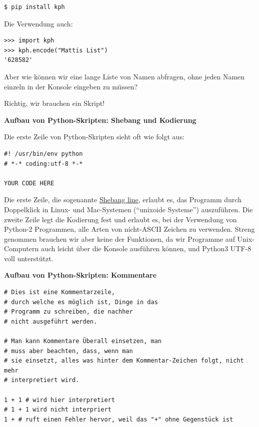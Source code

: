 \begin{verbatim}
$ pip install kph
\end{verbatim}

{Die Verwendung auch:}

\begin{verbatim}
>>> import kph
>>> kph.encode("Mattis List")
'628582'
\end{verbatim}

{Aber wie können wir eine lange Liste von Namen abfragen, ohne jeden
Namen einzeln in der Konsole eingeben zu müssen?}

{Richtig, wir brauchen ein Skript!}


\vspace{0.5cm}\par\noindent\textbf{Aufbau von Python-Skripten: Shebang und Kodierung}\vspace{0.5cm}

Die erste Zeile von Python-Skripten sieht oft wie folgt aus:

\begin{verbatim}
#! /usr/bin/env python
# *-* coding:utf-8 *-*

YOUR CODE HERE
\end{verbatim}

Die erste Zeile, die sogenannte
\href{http://de.wikipedia.org/wiki/Shebang}{Shebang line}, erlaubt es,
das Programm durch Doppelklick in Linux- und Mac-Systemen (``unixoide
Systeme'') auszuführen. Die zweite Zeile legt die Kodierung fest und
erlaubt es, bei der Verwendung von Python-2 Programmen, alle Arten von
nicht-ASCII Zeichen zu verwenden. Streng genommen brauchen wir aber
keine der Funktionen, da wir Programme auf Unix-Computern auch leicht
über die Konsole ausführen können, und Python3 UTF-8 voll unterstützt.



\vspace{0.5cm}\par\noindent\textbf{Aufbau von Python-Skripten: Kommentare}\vspace{0.5cm}

\begin{verbatim}
# Dies ist eine Kommentarzeile,
# durch welche es möglich ist, Dinge in das
# Programm zu schreiben, die nachher
# nicht ausgeführt werden.

# Man kann Kommentare Überall einsetzen, man 
# muss aber beachten, dass, wenn man
# sie einsetzt, alles was hinter dem Kommentar-Zeichen folgt, nicht mehr
# interpretiert wird.

1 + 1 # wird hier interpretiert
# 1 + 1 wird nicht interpriert
1 + # ruft einen Fehler hervor, weil das "+" ohne Gegenstück ist
\end{verbatim}

